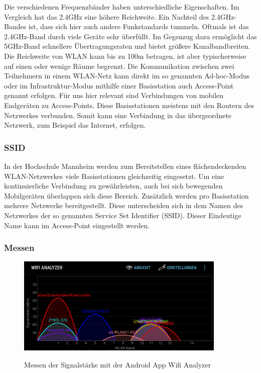 \documentclass{scrartcl}%
\begin{document}
Die verschiedenen Frequenzbänder haben unterschiedliche Eigenschaften. Im Vergleich hat das 2.4GHz eine höhere Reichweite. Ein Nachteil des 2.4GHz-Bandes ist, dass sich hier auch andere Funkstandards tummeln. Oftmals ist das 2.4GHz-Band durch viele Geräte sehr überfüllt. Im Gegenzug dazu ermöglicht das 5GHz-Band schnellere Übertragungsraten und bietet größere Kanalbandbreiten. Die Reichweite von WLAN kann bis zu 100m betragen, ist aber typischerweise auf einen oder wenige Räume begrenzt. 
Die Kommunikation zwischen zwei Teilnehmern in einem WLAN-Netz kann direkt im so genannten Ad-hoc-Modus oder im Infrastruktur-Modus mithilfe einer Basisstation auch Access-Point genannt erfolgen. Für uns hier relevant sind Verbindungen von mobilen Endgeräten zu Access-Points. Diese Basisstationen meistens mit den Routern des Netzwerkes verbunden. Somit kann eine Verbindung in das übergeordnete Netzwerk, zum Beispiel das Internet, erfolgen.

\subsubsection{SSID}
In der Hochschule Mannheim werden zum Bereitstellen eines flächendeckenden WLAN-Netzwerkes viele Basisstationen gleichzeitig eingesetzt. Um eine kontinuierliche Verbindung zu gewährleisten, auch bei sich bewegenden Mobilgeräten überlappen sich diese Bereich. 
Zusätzlich werden pro Basisstation mehrere Netzwerke bereitgestellt. Diese unterscheiden sich in dem Namen des Netzwerkes der so genannten Service Set Identifier (SSID). Dieser Eindeutige Name kann im Access-Point eingestellt werden. 

\subsubsection{Messen}

\begin{figure}[h]
	\centering
	\caption{Messen der Signalstärke mit der Android App Wifi Analyzer}
	\includegraphics[width=10cm]{bilder/wifianalyzer}
	\newline
	\label{wifiAnalyzer}
\end{figure}
\end{document}
